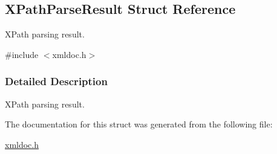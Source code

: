 \hypertarget{structXPathParseResult}{
\subsection{XPathParseResult Struct Reference}
\label{structXPathParseResult}
}


XPath parsing result.  




{\ttfamily \#include $<$xmldoc.h$>$}



\subsubsection{Detailed Description}
XPath parsing result. 

The documentation for this struct was generated from the following file:\begin{DoxyCompactItemize}
\item 
\hyperlink{xmldoc_8h}{xmldoc.h}\end{DoxyCompactItemize}
